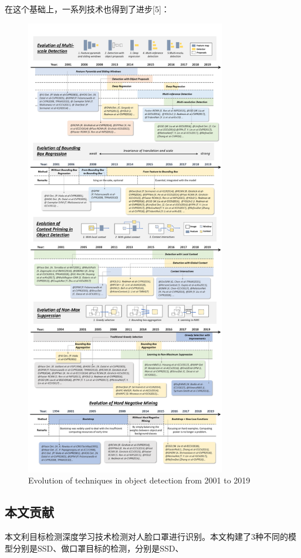 \documentclass[journal,transmag]{IEEEtran}
\begin{document}
在这个基础上，一系列技术也得到了进步[5]：
\begin{figure}[h]
\centering
\includegraphics[width=3.44in]{update.png}
\caption{Evolution of techniques in object detection from 2001 to 2019}
\end{figure}

\subsection{本文贡献}
本文利目标检测深度学习技术检测对人脸口罩进行识别。本文构建了3种不同的模型分别是SSD、做口罩目标的检测，分别是SSD、
\end{document}
